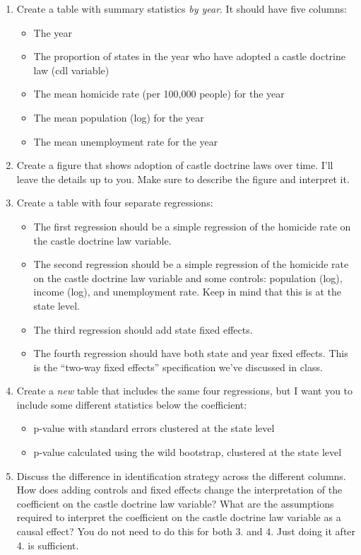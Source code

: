 \documentclass[
]{article}
\providecommand{\tightlist}{%
  \setlength{\itemsep}{0pt}\setlength{\parskip}{0pt}}
\begin{document}
\begin{enumerate}
\def\labelenumi{\arabic{enumi}.}
\tightlist
\item
  Create a table with summary statistics \emph{by year}. It should have five columns:

  \begin{itemize}
  \tightlist
  \item
    The year
  \item
    The proportion of states in the year who have adopted a castle doctrine law (cdl variable)
  \item
    The mean homicide rate (per 100,000 people) for the year
  \item
    The mean population (log) for the year
  \item
    The mean unemployment rate for the year
  \end{itemize}
\item
  Create a figure that shows adoption of castle doctrine laws over time. I'll leave the details up to you. Make sure to describe the figure and interpret it.
\item
  Create a table with four separate regressions:

  \begin{itemize}
  \tightlist
  \item
    The first regression should be a simple regression of the homicide rate on the castle doctrine law variable.
  \item
    The second regression should be a simple regression of the homicide rate on the castle doctrine law variable and some controls: population (log), income (log), and unemployment rate. Keep in mind that this is at the state level.
  \item
    The third regression should add state fixed effects.
  \item
    The fourth regression should have both state and year fixed effects. This is the ``two-way fixed effects'' specification we've discussed in class.
  \end{itemize}
\item
  Create a \emph{new} table that includes the same four regressions, but I want you to include some different statistics below the coefficient:

  \begin{itemize}
  \tightlist
  \item
    p-value with standard errors clustered at the state level
  \item
    p-value calculated using the wild bootstrap, clustered at the state level
  \end{itemize}
\item
  Discuss the difference in identification strategy across the different columns. How does adding controls and fixed effects change the interpretation of the coefficient on the castle doctrine law variable? What are the assumptions required to interpret the coefficient on the castle doctrine law variable as a causal effect? You do not need to do this for both 3. and 4. Just doing it after 4. is sufficient.
\end{enumerate}
\end{document}
